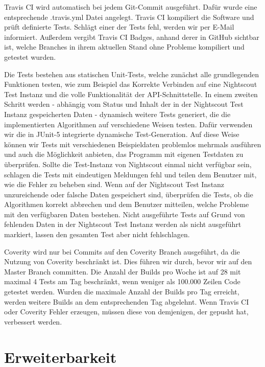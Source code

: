 \documentclass[accentcolor=tud0b,12pt,paper=a4]{tudreport}
\begin{document}
Travis CI wird automatisch bei jedem Git-Commit ausgeführt. Dafür wurde eine entsprechende .travis.yml Datei angelegt. Travis CI kompiliert die Software und prüft definierte Tests. Schlägt einer der Tests fehl, werden wir per E-Mail informiert. Außerdem vergibt Travis CI Badges, anhand derer in GitHub sichtbar ist, welche Branches in ihrem aktuellen Stand ohne Probleme kompiliert und getestet wurden.

Die Tests bestehen aus statischen Unit-Tests, welche zunächst alle grundlegenden Funktionen testen, wie zum Beispiel das Korrekte Verbinden auf eine Nightscout Test Instanz und die volle Funktionalität der API-Schnittstelle. In einem zweiten Schritt werden - abhängig vom Status und Inhalt der in der Nightscout Test Instanz gespeicherten Daten - dynamisch weitere Tests generiert, die die implementierten Algorithmen auf verschiedene Weisen testen. Dafür verwenden wir die in JUnit-5 integrierte dynamische Test-Generation. Auf diese Weise können wir Tests mit verschiedenen Beispieldaten problemlos mehrmals ausführen und auch die Möglichkeit anbieten, das Programm mit eigenen Testdaten zu überprüfen. Sollte die Test-Instanz von Nightscout einmal nicht verfügbar sein, schlagen die Tests mit eindeutigen Meldungen fehl und teilen dem Benutzer mit, wie die Fehler zu beheben sind. Wenn auf der Nightscout Test Instanz unzureichende oder falsche Daten gespeichert sind, überprüfen die Tests, ob die Algorithmen korrekt abbrechen und dem Benutzer mitteilen, welche Probleme mit den verfügbaren Daten bestehen. Nicht ausgeführte Tests auf Grund von fehlenden Daten in der Nightscout Test Instanz  werden als nicht ausgeführt markiert, lassen den gesamten Test aber nicht fehlschlagen.

Coverity wird nur bei Commits auf den Coverity Branch ausgeführt, da die Nutzung von Coverity beschränkt ist. Dies führen wir durch, bevor wir auf den Master Branch committen. Die Anzahl der Builds pro Woche ist auf 28 mit maximal 4 Tests am Tag beschränkt, wenn weniger als 100.000 Zeilen Code getestet werden. Wurden die maximale Anzahl der Builds pro Tag erreicht, werden weitere Builds an dem entsprechenden Tag abgelehnt. Wenn Travis CI oder Coverity Fehler erzeugen, müssen diese von demjenigen, der gepusht hat, verbessert werden. 

\newpage

\section{Erweiterbarkeit}
\end{document}
